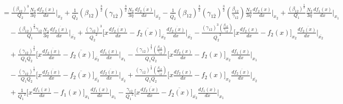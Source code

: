 \documentclass[fleqn, 10pt]{article}
\begin{document}
\begin{equation*}
\begin{split}
    &=   \frac{(\beta_{12})^3}{Q_2} \frac{N_2}{3 \eta} \frac{df_2(x)}{dx} \Bigg|_{x_2} +  \frac{1}{\overline{Q_{2}}} (\beta_{12})^\frac{3}{2} (\gamma_{1\overline{2}})^\frac{3}{2} \frac{N_2}{3 \eta} \frac{d\overline{f_{2}(x)}}{dx} \Bigg|_{\overline{x_{2}}} -   \frac{1}{\overline{Q_{2}}} (\beta_{12})^\frac{3}{2} (\gamma_{1\overline{2}})^\frac{3}{2} \left( \frac{\beta_{12}}{\gamma_{1\overline{2}}}\right) \frac{N_2}{3 \eta} \frac{df_2(x)}{dx} \Bigg|_{x_2} +   \frac{(\beta_{12})^\frac{3}{2}}{Q_1} \frac{N_2}{3 \eta} \frac{df_1(x)}{dx} \Bigg|_{x_1} \\ & \quad -     \frac{(\beta_{12})^\frac{3}{2} \gamma_{1\overline{2}}}{Q_1} \frac{N_2}{3 \eta} \frac{d\overline{f_{2}(x)}}{dx} \Bigg|_{\overline{x_{2}}}  + \frac{(\gamma_{1\overline{2}})^3}{{\overline{Q_{2}}}^2} \biggl[ x\frac{d\overline{f_{2}(x)}}{dx} - \overline{f_{2}(x)} \biggr]_{\overline{x_{2}}} \frac{d\overline{f_{2}(x)}}{dx} \Bigg|_{\overline{x_{2}}} - \frac{(\gamma_{1\overline{2}})^3\left( \frac{\beta_{12}}{\gamma_{1\overline{2}}}\right)}{{\overline{Q_{2}}}^2} \biggl[ x \frac{df_2(x)}{dx} -   f_2(x) \biggr]_{x_2} \frac{d\overline{f_{2}(x)}}{dx} \Bigg|_{\overline{x_{2}}} \\ & \quad +   \frac{(\gamma_{1\overline{2}})^\frac{3}{2}}{Q_1 \overline{Q_{2}}} \biggl[x \frac{d\overline{f_{2}(x)}}{dx} - \overline{f_{2}(x)} \biggr]_{\overline{x_{2}}} \frac{df_1(x)}{dx} \Bigg|_{x_1} - \frac{(\gamma_{1\overline{2}})^\frac{3}{2} \left( \frac{\beta_{12}}{\gamma_{1\overline{2}}}\right)}{Q_1 \overline{Q_{2}}} \biggl[ x \frac{df_2(x)}{dx} -  f_2(x) \biggr]_{x_2} \frac{df_1(x)}{dx} \Bigg|_{x_1} \\ & \quad -     \frac{(\gamma_{1\overline{2}})^\frac{5}{2}}{Q_1 \overline{Q_{2}}} \biggl[ x \frac{d\overline{f_{2}(x)}}{dx} - \overline{f_{2}(x)} \biggr]_{\overline{x_{2}}} \frac{d\overline{f_{2}(x)}}{dx} \Bigg|_{\overline{x_{2}}} + \frac{(\gamma_{1\overline{2}})^\frac{5}{2} \left( \frac{\beta_{12}}{\gamma_{1\overline{2}}}\right)}{Q_1 \overline{Q_{2}}} \biggl[ x\frac{d f_2(x)}{dx} -   f_2(x) \biggr]_{x_2} \frac{d\overline{f_{2}(x)}}{dx} \Bigg|_{\overline{x_{2}}} \\ & \quad + \frac{1}{{Q_1}^2} \biggl[ x \frac{df_1(x)}{dx} - f_1(x) \biggr]_{x_1} \frac{df_1(x)}{dx} \Bigg|_{x_1} - \frac{\gamma_{1\overline{2}}}{{Q_1}^2} \biggl[ x \frac{d\overline{f_{2}(x)}}{dx} -  \overline{f_{2}(x)} \biggr]_{\overline{x_{2}}} \frac{df_1(x)}{dx} \Bigg|_{x_1} 
    \end{split}
\end{equation*}
\end{document}
